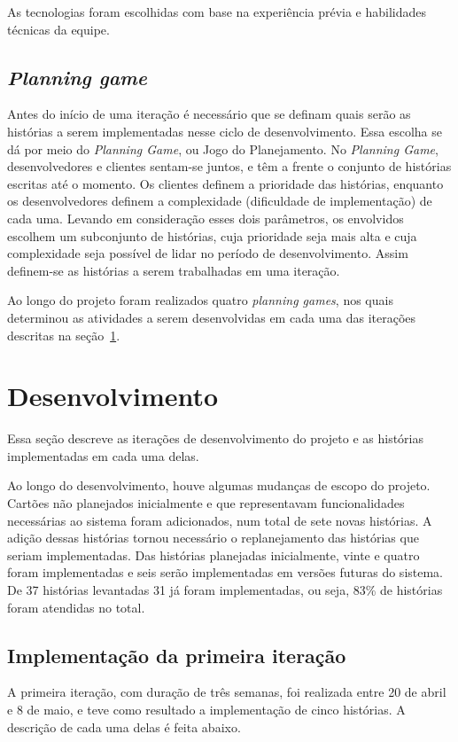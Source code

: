 As tecnologias foram escolhidas com base na experiência prévia e habilidades técnicas da equipe.

  \subsection{\textit{Planning game}}
    Antes do início de uma iteração é necessário que se definam quais serão as histórias a serem implementadas nesse ciclo de desenvolvimento. Essa escolha se dá por meio do \textit{Planning Game}, ou Jogo do Planejamento. No \textit{Planning Game}, desenvolvedores e clientes sentam-se juntos, e têm a frente o conjunto de histórias escritas até o momento. Os clientes definem a prioridade das histórias, enquanto os desenvolvedores definem a complexidade (dificuldade de implementação) de cada uma. Levando em consideração esses dois parâmetros, os envolvidos escolhem um subconjunto de histórias, cuja prioridade seja mais alta e cuja complexidade seja possível de lidar no período de desenvolvimento. Assim definem-se as histórias a serem trabalhadas em uma iteração.

    Ao longo do projeto foram realizados quatro \textit{planning games}, nos quais determinou as atividades a serem desenvolvidas em cada uma das iterações descritas na seção~\ref{iteracoes}.

\section{Desenvolvimento}\label{iteracoes}

  Essa seção descreve as iterações de desenvolvimento do projeto e as histórias implementadas em cada uma delas.

  Ao longo do desenvolvimento, houve algumas mudanças de escopo do projeto. Cartões não planejados inicialmente e que representavam funcionalidades necessárias ao sistema foram adicionados, num total de sete novas histórias. A adição dessas histórias tornou necessário o replanejamento das histórias que seriam implementadas. Das histórias planejadas inicialmente, vinte e quatro foram implementadas e seis serão implementadas em versões futuras do sistema. De 37 histórias levantadas 31 já foram implementadas, ou seja, 83\% de histórias foram atendidas no total.

  \subsection{Implementação da primeira iteração}
    A primeira iteração, com duração de três semanas, foi realizada entre 20 de abril e 8 de maio, e teve como resultado a implementação de cinco histórias. A descrição de cada uma delas é feita abaixo.

